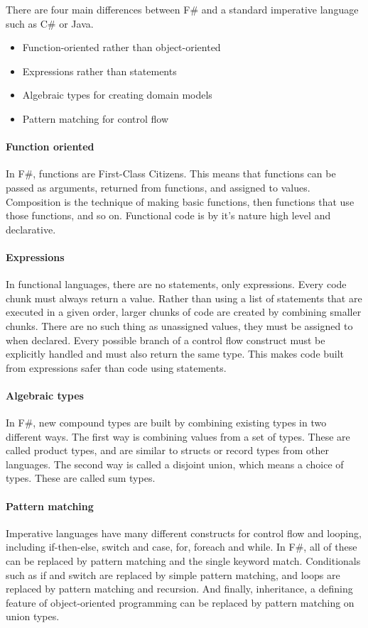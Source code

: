 \documentclass[12pt, a4paper]{article}
\begin{document}
There are four main differences between F\# and a standard imperative language such as C\# or Java.
\begin{itemize}
\item Function-oriented rather than object-oriented
\item Expressions rather than statements
\item Algebraic types for creating domain models
\item Pattern matching for control flow
\end{itemize}

\newpage
\paragraph{Function oriented}
In F\#, functions are First-Class Citizens. This means that functions can be passed as arguments, returned from functions, and assigned to values. Composition is the technique of making basic functions, then functions that use those functions, and so on. Functional code is by it's nature high level and declarative.

\paragraph{Expressions}
In functional languages, there are no statements, only expressions. Every code chunk must always return a value. Rather than using a list of statements that are executed in a given order, larger chunks of code are created by combining smaller chunks. There are no such thing as unassigned values, they must be assigned to when declared. Every possible branch of a control flow construct must be explicitly handled and must also return the same type. This makes code built from expressions safer than code using statements.

\paragraph{Algebraic types}
In F\#, new compound types are built by combining existing types in two different ways. The first way is combining values from a set of types. These are called product types, and are similar to structs or record types from other languages. The second way is called a disjoint union, which means a choice of types. These are called sum types.

\paragraph{Pattern matching}
Imperative languages have many different constructs for control flow and looping, including if-then-else, switch and case, for, foreach and while. In F\#, all of these can be replaced by pattern matching and the single keyword match. Conditionals such as if and switch are replaced by simple pattern matching, and loops are replaced by pattern matching and recursion. And finally, inheritance, a defining feature of object-oriented programming can be replaced by pattern matching on union types.
\end{document}
